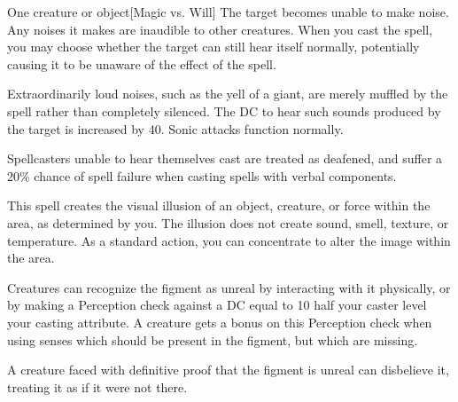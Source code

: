 \begin{spellheader}
    \spellrng{\rngmed}
    \spelldur{\durshort \dismissable}
\end{spellheader}
\begin{spelleffects}
    \begin{spelltarget}{One creature or object}[Magic vs. Will]
        \spelleffect The target becomes unable to make noise. Any noises it makes are inaudible to other creatures. When you cast the spell, you may choose whether the target can still hear itself normally, potentially causing it to be unaware of the effect of the spell.

        Extraordinarily loud noises, such as the yell of a giant, are merely muffled by the spell rather than completely silenced. The DC to hear such sounds produced by the target is increased by 40. Sonic attacks function normally.
    \end{spelltarget}
\end{spelleffects}
\begin{spellfooter}
    \spellnotes Spellcasters unable to hear themselves cast are treated as deafened, and suffer a 20\% chance of spell failure when casting spells with verbal components.
\end{spellfooter}

\begin{spellheader}
    \spelldur{\durshort}
\end{spellheader}
\begin{spelleffects}
    \spelleffect This spell creates the visual illusion of an object, creature, or force within the area, as determined by you. The illusion does not create sound, smell, texture, or temperature. As a standard action, you can concentrate to alter the image within the area.
\end{spelleffects}
\begin{spellfooter}
    \spellnotes Creatures can recognize the figment as unreal by interacting with it physically, or by making a Perception check against a DC equal to 10 \add half your caster level \add your casting attribute. A creature gets a  bonus on this Perception check when using senses which should be present in the figment, but which are missing.

    A creature faced with definitive proof that the figment is unreal can disbelieve it, treating it as if it were not there.
\end{spellfooter}

